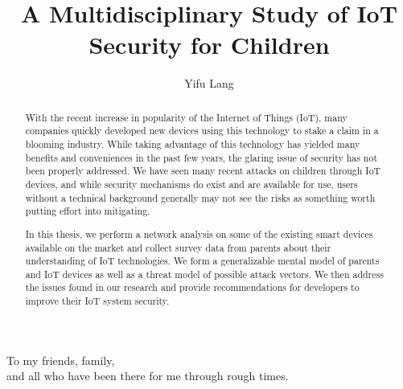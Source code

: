 \documentclass[12pt]{ucthesis}
\begin{document}

\title{A Multidisciplinary Study of IoT Security for Children}
\author{Yifu Lang}
\deanlinethree{}

\begin{frontmatter}

\maketitle
\copyrightpage

\tableofcontents
\listoffigures
\listoftables

\begin{abstract}
With the recent increase in popularity of the Internet of Things (IoT), many companies quickly developed new devices using this technology to stake a claim in a blooming industry. While taking advantage of this technology has yielded many benefits and conveniences in the past few years, the glaring issue of security has not been properly addressed. We have seen many recent attacks on children through IoT devices, and while security mechanisms do exist and are available for use, users without a technical background generally may not see the risks as something worth putting effort into mitigating. 

In this thesis, we perform a network analysis on some of the existing smart devices available on the market and collect survey data from parents about their understanding of IoT technologies. We form a generalizable mental model of parents and IoT devices as well as a threat model of possible attack vectors. We then address the issues found in our research and provide recommendations for developers to improve their IoT system security. 
\end{abstract}

\begin{dedication}
\null\vfil
{\large
\begin{center}
To my friends, family,\\\vspace{12pt}
and all who have been there for me through rough times.\\\vspace{12pt}
\end{center}}
\vfil\null
\end{dedication}


\end{frontmatter}
\end{document}
